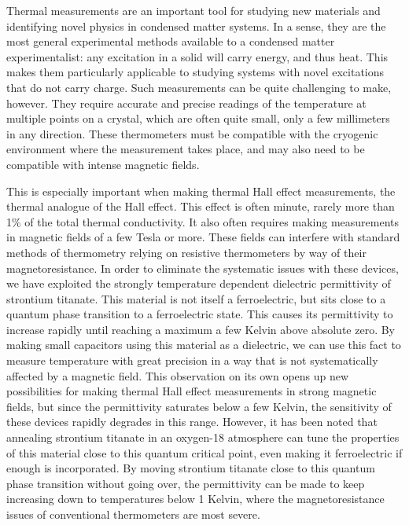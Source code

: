 \documentclass{thesis-umich}
\begin{document}
Thermal measurements are an important tool for studying new materials and identifying novel physics in condensed matter systems. In a sense, they are the most general experimental methods available to a condensed matter experimentalist: any excitation in a solid will carry energy, and thus heat. This makes them particularly applicable to studying systems with novel excitations that do not carry charge. Such measurements can be quite challenging to make, however. They require accurate and precise readings of the temperature at multiple points on a crystal, which are often quite small, only a few millimeters in any direction. These thermometers must be compatible with the cryogenic environment where the measurement takes place, and may also need to be compatible with intense magnetic fields.

This is especially important when making thermal Hall effect measurements, the thermal analogue of the Hall effect. This effect is often minute, rarely more than 1\% of the total thermal conductivity. It also often requires making measurements in magnetic fields of a few Tesla or more. These fields can interfere with standard methods of thermometry relying on resistive thermometers by way of their magnetoresistance. In order to eliminate the systematic issues with these devices, we have exploited the strongly temperature dependent dielectric permittivity of strontium titanate. This material is not itself a ferroelectric, but sits close to a quantum phase transition to a ferroelectric state. This causes its permittivity to increase rapidly until reaching a maximum a few Kelvin above absolute zero. By making small capacitors using this material as a dielectric, we can use this fact to measure temperature with great precision in a way that is not systematically affected by a magnetic field. This observation on its own opens up new possibilities for making thermal Hall effect measurements in strong magnetic fields, but since the permittivity saturates below a few Kelvin, the sensitivity of these devices rapidly degrades in this range. However, it has been noted that annealing strontium titanate in an oxygen-18 atmosphere can tune the properties of this material close to this quantum critical point, even making it ferroelectric if enough is incorporated. By moving strontium titanate close to this quantum phase transition without going over, the permittivity can be made to keep increasing down to temperatures below 1 Kelvin, where the magnetoresistance issues of conventional thermometers are most severe. 
\end{document}
